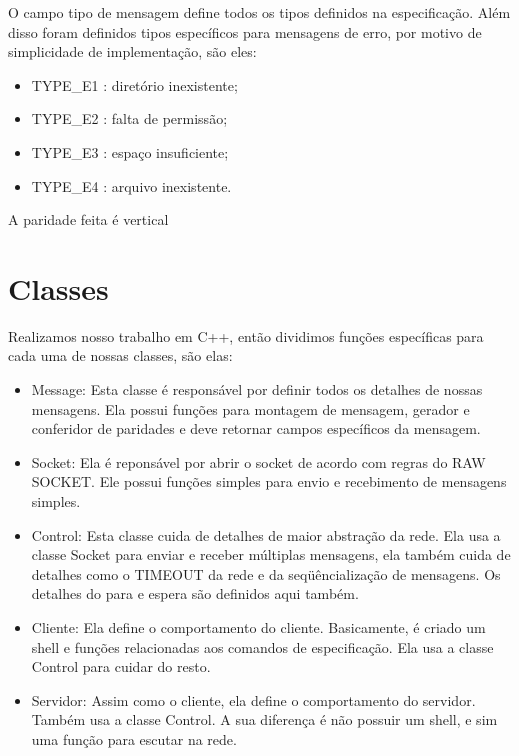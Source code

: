 \documentclass[a4paper,10pt]{coursepaper}
\begin{document}
O campo tipo de mensagem define todos os tipos definidos na especificação. Além disso foram definidos tipos específicos para mensagens de erro, por motivo de simplicidade de implementação, são eles:
\begin{itemize}
 \item TYPE\_E1 : diretório inexistente;
 \item TYPE\_E2 : falta de permissão;
 \item TYPE\_E3 : espaço insuficiente;
 \item TYPE\_E4 : arquivo inexistente.
\end{itemize}

A paridade feita é vertical

\section{Classes}

Realizamos nosso trabalho em C++, então dividimos funções específicas para cada uma de nossas classes, são elas:
\begin{itemize}
 \item Message:
 Esta classe é responsável por definir todos os detalhes de nossas mensagens. Ela possui funções para montagem de mensagem, gerador e conferidor de paridades e deve retornar campos específicos da mensagem.
 \item Socket:
 Ela é reponsável por abrir o socket de acordo com regras do RAW SOCKET. Ele possui funções simples para envio e recebimento de mensagens simples.
 \item Control:
 Esta classe cuida de detalhes de maior abstração da rede. Ela usa a classe Socket para enviar e receber múltiplas mensagens, ela também cuida de detalhes como o TIMEOUT da rede e da seqüêncialização de mensagens. Os detalhes do para e espera são definidos aqui também.
 \item Cliente:
 Ela define o comportamento do cliente. Basicamente, é criado um shell e funções relacionadas aos comandos de especificação. Ela usa a classe Control para cuidar do resto.
 \item Servidor:
 Assim como o cliente, ela define o comportamento do servidor. Também usa a classe Control. A sua diferença é não possuir um shell, e sim uma função para escutar na rede.
\end{itemize}
\end{document}
